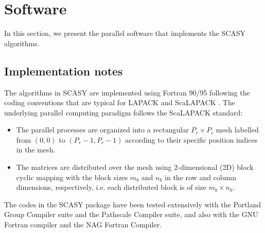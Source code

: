 \documentclass[11pt]{article}
\begin{document}
%
%

\section{Software} \label{sec:software}
In this section, we present the parallel software that implements
the SCASY algorithms.

\subsection{Implementation notes}
The algorithms in SCASY are implemented using Fortran 90/95
following the coding conventions that are typical for LAPACK
\cite{lapack3} and ScaLAPACK \cite{blackfordetal97}. The
underlying parallel computing paradigm follows the ScaLAPACK standard:
%
\begin{itemize}
    \item The parallel processes are organized into a
    rectangular $P_r \times P_c$ mesh labelled from $(0,0)$
    to $(P_r-1,P_c-1)$ according to their specific position
    indices in the mesh.
    \item The matrices are distributed over the mesh using
    2-dimensional (2D) block cyclic mapping with the block
    sizes $m_b$ and $n_b$ in the row and
    column dimensions, respectively, i.e. each distributed block
    is of size $m_b \times n_b$.
\end{itemize}
%
The codes in the SCASY package have been tested extensively with
the Portland Group Compiler suite and the Pathscale Compiler
suite, and also with the GNU Fortran compiler and the NAG
Fortran Compiler.
\end{document}
